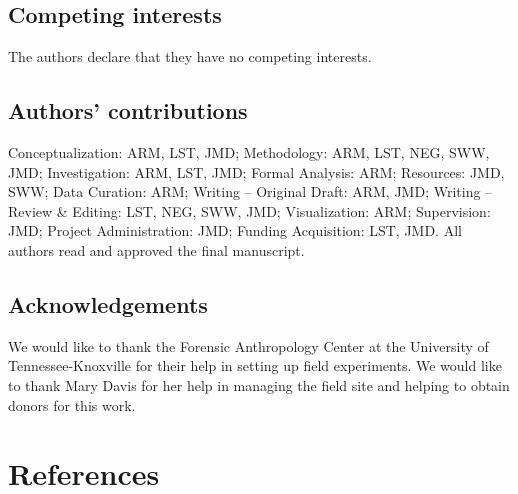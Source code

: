 \documentclass[
  sn-nature,
  lineno, referee]{sn-jnl}
\begin{document}
\subsection{Competing interests}\label{competing-interests}

The authors declare that they have no competing interests.

\subsection{Authors' contributions}\label{authors-contributions}

Conceptualization: ARM, LST, JMD; Methodology: ARM, LST, NEG, SWW, JMD;
Investigation: ARM, LST, JMD; Formal Analysis: ARM; Resources: JMD, SWW;
Data Curation: ARM; Writing -- Original Draft: ARM, JMD; Writing --
Review \& Editing: LST, NEG, SWW, JMD; Visualization: ARM; Supervision:
JMD; Project Administration: JMD; Funding Acquisition: LST, JMD. All
authors read and approved the final manuscript.

\subsection{Acknowledgements}\label{acknowledgements}

We would like to thank the Forensic Anthropology Center at the
University of Tennessee-Knoxville for their help in setting up field
experiments. We would like to thank Mary Davis for her help in managing
the field site and helping to obtain donors for this work.

\section{References}\label{references}
\end{document}
